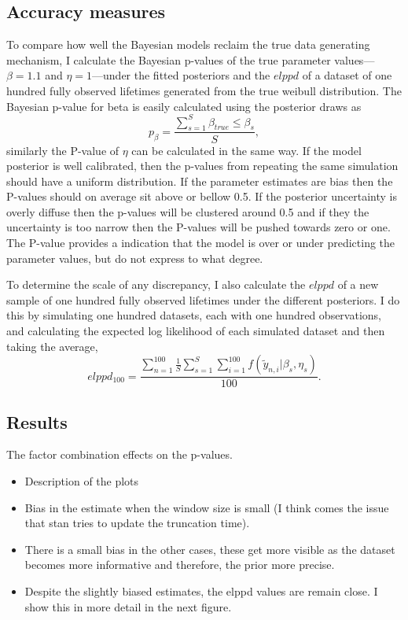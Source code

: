 \subsection{Accuracy measures}

To compare how well the Bayesian models reclaim the true data generating mechanism, I calculate the Bayesian p-values of the true parameter values---$\beta = 1.1$ and $\eta = 1$---under the fitted posteriors and the $elppd$ of a dataset of one hundred fully observed lifetimes generated from the true weibull distribution. The Bayesian p-value for beta is easily calculated using the posterior draws as
\begin{equation*}
    p_{\beta} = \frac{\sum^{S}_{s = 1}{\beta_{true} \le \beta_s}}{S},
\end{equation*}
similarly the P-value of $\eta$ can be calculated in the same way. If the model posterior is well calibrated, then the p-values from repeating the same simulation should have a uniform distribution. If the parameter estimates are bias then the P-values should on average sit above or bellow 0.5. If the posterior uncertainty is overly diffuse then the p-values will be clustered around 0.5 and if they the uncertainty is too narrow then the P-values will be pushed towards zero or one. The P-value provides a indication that the model is over or under predicting the parameter values, but do not express to what degree.

To determine the scale of any discrepancy, I also calculate the $elppd$ of a new sample of one hundred fully observed lifetimes under the different posteriors. I do this by simulating one hundred datasets, each with one hundred observations, and calculating the expected log likelihood of each simulated dataset and then taking the average,
\begin{equation*}
    elppd_{100} = \frac{\sum_{n = 1}^{100}\frac{1}{S}\sum_{s = 1}^{S}\sum_{i = 1}^{100}f(\tilde{y}_{n, i}|\beta_s, \eta_s)}{100}.
\end{equation*}

\subsection{Results}

The factor combination effects on the p-values.
\begin{itemize}
    \item Description of the plots
    \item Bias in the estimate when the window size is small (I think comes the issue that stan tries to update the truncation time).
    \item There is a small bias in the other cases, these get more visible as the dataset becomes more informative and therefore, the prior more precise.
    \item Despite the slightly biased estimates, the elppd values are remain close. I show this in more detail in the next figure.
\end{itemize}

